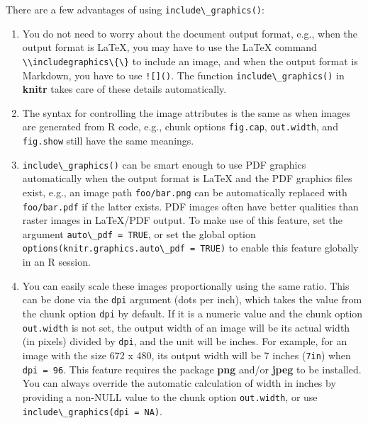 \documentclass[doctor,openright,twoside]{sjtuthesis}
\providecommand{\tightlist}{%
    \setlength{\itemsep}{0pt}\setlength{\parskip}{0pt}}
\newcommand{\passthrough}[1]{#1}
\theoremstyle{plain}
\theoremstyle{definition}
\theoremstyle{remark}
\theoremstyle{ocrenumbox}
\theoremstyle{plain}
\begin{document}
There are a few advantages of using
\passthrough{\lstinline!include\_graphics()!}:

\begin{enumerate}
\def\labelenumi{\arabic{enumi}.}
\tightlist
\item
  You do not need to worry about the document output format, e.g., when
  the output format is LaTeX, you may have to use the LaTeX command
  \passthrough{\lstinline!\\includegraphics\{\}!} to include an image,
  and when the output format is Markdown, you have to use
  \passthrough{\lstinline"![]()"}. The function
  \passthrough{\lstinline!include\_graphics()!} in \textbf{knitr} takes
  care of these details automatically.
\item
  The syntax for controlling the image attributes is the same as when
  images are generated from R code, e.g., chunk options
  \passthrough{\lstinline!fig.cap!},
  \passthrough{\lstinline!out.width!}, and
  \passthrough{\lstinline!fig.show!} still have the same meanings.
\item
  \passthrough{\lstinline!include\_graphics()!} can be smart enough to
  use PDF graphics automatically when the output format is LaTeX and the
  PDF graphics files exist, e.g., an image path
  \passthrough{\lstinline!foo/bar.png!} can be automatically replaced
  with \passthrough{\lstinline!foo/bar.pdf!} if the latter exists. PDF
  images often have better qualities than raster images in LaTeX/PDF
  output. To make use of this feature, set the argument
  \passthrough{\lstinline!auto\_pdf = TRUE!}, or set the global option
  \passthrough{\lstinline!options(knitr.graphics.auto\_pdf = TRUE)!} to
  enable this feature globally in an R session.
\item
  You can easily scale these images proportionally using the same ratio.
  This can be done via the \passthrough{\lstinline!dpi!} argument (dots
  per inch), which takes the value from the chunk option
  \passthrough{\lstinline!dpi!} by default. If it is a numeric value and
  the chunk option \passthrough{\lstinline!out.width!} is not set, the
  output width of an image will be its actual width (in pixels) divided
  by \passthrough{\lstinline!dpi!}, and the unit will be inches. For
  example, for an image with the size 672 x 480, its output width will
  be 7 inches (\passthrough{\lstinline!7in!}) when
  \passthrough{\lstinline!dpi = 96!}. This feature requires the package
  \textbf{png} and/or \textbf{jpeg} to be installed. You can always
  override the automatic calculation of width in inches by providing a
  non-NULL value to the chunk option
  \passthrough{\lstinline!out.width!}, or use
  \passthrough{\lstinline!include\_graphics(dpi = NA)!}.
\end{enumerate}
\end{document}
